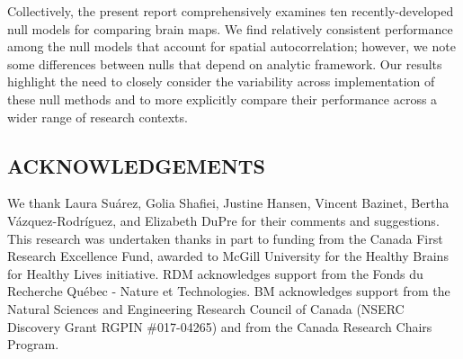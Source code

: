 \documentclass[12pt,aps,pra,reprint,showkeys]{revtex4-1}
\renewcommand{\thetable}{\arabic{table}}
\newcommand{\beginsupplement}{
  \setcounter{equation}{0} \renewcommand{\theequation}{S\arabic{equation}}
  \setcounter{table}{0} \renewcommand{\thetable}{S\arabic{table}}
  \setcounter{figure}{0} \renewcommand{\thefigure}{S\arabic{figure}}
}
\begin{document}
Collectively, the present report comprehensively examines ten recently-developed null models for comparing brain maps.
We find relatively consistent performance among the null models that account for spatial autocorrelation; however, we note some differences between nulls that depend on analytic framework.
Our results highlight the need to closely consider the variability across implementation of these null methods and to more explicitly compare their performance across a wider range of research contexts.

\subsection*{ACKNOWLEDGEMENTS}

We thank Laura Su{\'a}rez, Golia Shafiei, Justine Hansen, Vincent Bazinet, Bertha V{\'a}zquez-Rodr{\'i}guez, and Elizabeth DuPre for their comments and suggestions. This research was undertaken thanks in part to funding from the Canada First Research Excellence Fund, awarded to McGill University for the Healthy Brains for Healthy Lives initiative. RDM acknowledges support from the Fonds du Recherche Qu{\'e}bec - Nature et Technologies. BM acknowledges support from the Natural Sciences and Engineering Research Council of Canada (NSERC Discovery Grant RGPIN \#017-04265) and from the Canada Research Chairs Program.



\clearpage

\beginsupplement
\end{document}
